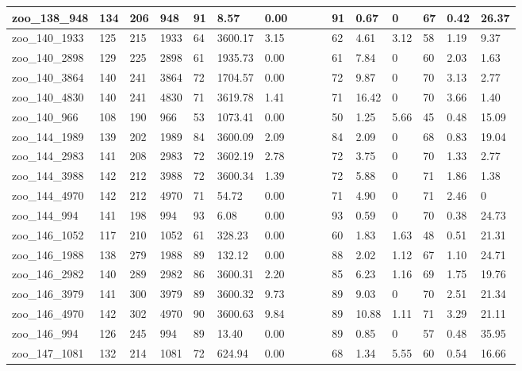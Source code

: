 \begin{landscape}
\begin{longtable}{llllllllllllllll}
zoo\_138\_948 & 134 & 206 & 948 & 91 & 8.57 & 0.00 &  &  &  & 91 & 0.67 & 0 & 67 & 0.42 & 26.37 \\ \hline 
zoo\_140\_1933 & 125 & 215 & 1933 & 64 & 3600.17 & 3.15 &  &  &  & 62 & 4.61 & 3.12 & 58 & 1.19 & 9.37 \\ \hline 
zoo\_140\_2898 & 129 & 225 & 2898 & 61 & 1935.73 & 0.00 &  &  &  & 61 & 7.84 & 0 & 60 & 2.03 & 1.63 \\ \hline 
zoo\_140\_3864 & 140 & 241 & 3864 & 72 & 1704.57 & 0.00 &  &  &  & 72 & 9.87 & 0 & 70 & 3.13 & 2.77 \\ \hline 
zoo\_140\_4830 & 140 & 241 & 4830 & 71 & 3619.78 & 1.41 &  &  &  & 71 & 16.42 & 0 & 70 & 3.66 & 1.40 \\ \hline 
zoo\_140\_966 & 108 & 190 & 966 & 53 & 1073.41 & 0.00 &  &  &  & 50 & 1.25 & 5.66 & 45 & 0.48 & 15.09 \\ \hline 
zoo\_144\_1989 & 139 & 202 & 1989 & 84 & 3600.09 & 2.09 &  &  &  & 84 & 2.09 & 0 & 68 & 0.83 & 19.04 \\ \hline 
zoo\_144\_2983 & 141 & 208 & 2983 & 72 & 3602.19 & 2.78 &  &  &  & 72 & 3.75 & 0 & 70 & 1.33 & 2.77 \\ \hline 
zoo\_144\_3988 & 142 & 212 & 3988 & 72 & 3600.34 & 1.39 &  &  &  & 72 & 5.88 & 0 & 71 & 1.86 & 1.38 \\ \hline 
zoo\_144\_4970 & 142 & 212 & 4970 & 71 & 54.72 & 0.00 &  &  &  & 71 & 4.90 & 0 & 71 & 2.46 & 0 \\ \hline 
zoo\_144\_994 & 141 & 198 & 994 & 93 & 6.08 & 0.00 &  &  &  & 93 & 0.59 & 0 & 70 & 0.38 & 24.73 \\ \hline 
zoo\_146\_1052 & 117 & 210 & 1052 & 61 & 328.23 & 0.00 &  &  &  & 60 & 1.83 & 1.63 & 48 & 0.51 & 21.31 \\ \hline 
zoo\_146\_1988 & 138 & 279 & 1988 & 89 & 132.12 & 0.00 &  &  &  & 88 & 2.02 & 1.12 & 67 & 1.10 & 24.71 \\ \hline 
zoo\_146\_2982 & 140 & 289 & 2982 & 86 & 3600.31 & 2.20 &  &  &  & 85 & 6.23 & 1.16 & 69 & 1.75 & 19.76 \\ \hline 
zoo\_146\_3979 & 141 & 300 & 3979 & 89 & 3600.32 & 9.73 &  &  &  & 89 & 9.03 & 0 & 70 & 2.51 & 21.34 \\ \hline 
zoo\_146\_4970 & 142 & 302 & 4970 & 90 & 3600.63 & 9.84 &  &  &  & 89 & 10.88 & 1.11 & 71 & 3.29 & 21.11 \\ \hline 
zoo\_146\_994 & 126 & 245 & 994 & 89 & 13.40 & 0.00 &  &  &  & 89 & 0.85 & 0 & 57 & 0.48 & 35.95 \\ \hline 
zoo\_147\_1081 & 132 & 214 & 1081 & 72 & 624.94 & 0.00 &  &  &  & 68 & 1.34 & 5.55 & 60 & 0.54 & 16.66 \\ \hline 

\end{longtable}
\end{landscape}
